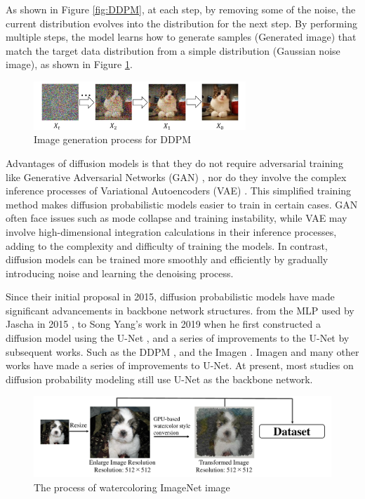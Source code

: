 \documentclass{acsman}
\begin{document}
As shown in Figure \ref{fig:DDPM}, at each step, by removing some of the noise, the current distribution evolves into the distribution for the next step. By performing multiple steps, the model learns how to generate samples (Generated image) that match the target data distribution from a simple distribution (Gaussian noise image), as shown in Figure \ref{fig:DDPM1}.
\begin{figure}[h]
    \centering
    \includegraphics[width=8cm]{image/DDPM1.pdf}
    \caption{Image generation process for DDPM}
    \label{fig:DDPM1}
\end{figure}

Advantages of diffusion models is that they do not require adversarial training like Generative Adversarial Networks (GAN) \cite{goodfellow2020generative}, nor do they involve the complex inference processes of Variational Autoencoders (VAE) \cite{kingma2013auto}. This simplified training method makes diffusion probabilistic models easier to train in certain cases. GAN often face issues such as mode collapse and training instability, while VAE may involve high-dimensional integration calculations in their inference processes, adding to the complexity and difficulty of training the models. In contrast, diffusion models can be trained more smoothly and efficiently by gradually introducing noise and learning the denoising process.

Since their initial proposal in 2015, diffusion probabilistic models have made significant advancements in backbone network structures. from the MLP used by Jascha in 2015 \cite{sohl2015deep}, to Song Yang's work in 2019 when he first constructed a diffusion model using the U-Net \cite{song2019generative}, and a series of improvements to the U-Net by subsequent works. Such as the DDPM \cite{ho2020denoising}, and the Imagen \cite{saharia2022photorealistic}. Imagen and many other works have made a series of improvements to U-Net. At present, most studies on diffusion probability modeling still use U-Net as the backbone network.

\begin{figure}[thb]
    \centering
    \includegraphics[width=14cm]{image/gpu.pdf}
    \caption{The process of watercoloring ImageNet image}
    \label{fig:gpu}
\end{figure}
\end{document}
